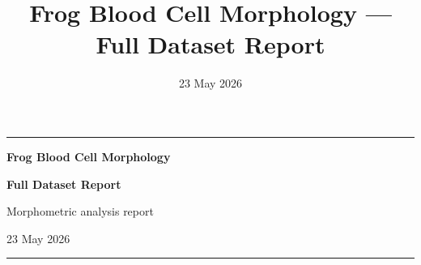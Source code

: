 \documentclass[
  english,
]{article}
\title{Frog Blood Cell Morphology --- Full Dataset Report}
\author{}
\date{23 May 2026}
\begin{document}
\begin{titlepage}
\thispagestyle{empty}
\centering
\vspace*{2.2cm}
{\color{ReportAccent}\rule{\textwidth}{2pt}\par}
\vspace{1.4cm}
{\Huge\bfseries\color{ReportAccent} Frog Blood Cell Morphology\par}
\vspace{0.35em}
{\Huge\bfseries\color{ReportAccent} Full Dataset Report\par}
\vspace{1.2cm}
{\large\color{ReportMuted} Morphometric analysis report\par}
\vfill
{\large 23 May 2026\par}
\vspace{2cm}
{\color{ReportAccent}\rule{\textwidth}{2pt}\par}
\end{titlepage}
\setcounter{page}{1}
\end{document}
